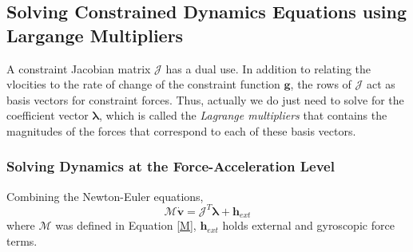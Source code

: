    \subsection{Solving Constrained Dynamics Equations using Largange Multipliers}
        A constraint Jacobian matrix $\mathcal{J}$ has a dual use. In addition to relating the vlocities to the rate of change of the constraint function $\pmb{g}$, the rows of $\mathcal{J}$ act as basis vectors for constraint forces. Thus, actually we do just need to solve for the coefficient vector $\pmb{\lambda}$, which is called the \textit{Lagrange multipliers} that contains the magnitudes of the forces that correspond to each of these basis vectors.

        \subsubsection{Solving Dynamics at the Force-Acceleration Level}
        Combining the Newton-Euler equations,
        \begin{equation}
            \mathcal{M}\dot{\mathbf{v}} = \mathcal{J}^{T}\pmb{\lambda} + \mathbf{h}_{ext}
        \end{equation}
        where $\mathcal{M}$ was defined in Equation \ref{M}, $\mathbf{h}_{ext}$ holds external and gyroscopic force terms. 

